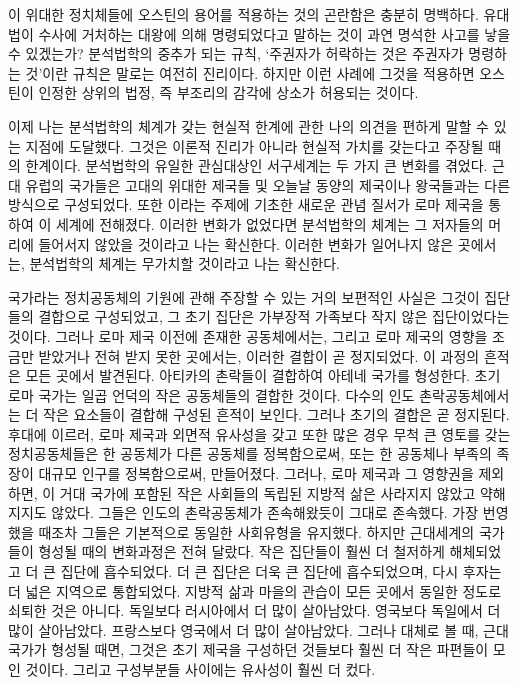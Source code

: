 이 위대한 정치체들에 오스틴의 용어를 적용하는 것의 곤란함은 충분히 명백하다.
유대법이 수사에 거처하는 대왕에 의해 명령되었다고 말하는 것이
과연 명석한 사고를 낳을 수 있겠는가?
분석법학의 중추가 되는 규칙, `주권자가 허락하는 것은 주권자가 명령하는 것'이란
규칙은 말로는 여전히 진리이다.
하지만 이런 사례에 그것을 적용하면
오스틴이 인정한 상위의 법정, 즉 부조리의 감각에 상소가 허용되는 것이다.

이제 나는
분석법학의 체계가
갖는 현실적 한계에 관한 나의 의견을 편하게 말할 수 있는
지점에 도달했다.
그것은 이론적 진리가 아니라 현실적 가치를 갖는다고
주장될 때의 한계이다.
분석법학의 유일한 관심대상인
서구세계는 두 가지 큰 변화를 겪었다.
근대 유럽의 국가들은  고대의 위대한 제국들 및
오늘날 동양의 제국이나 왕국들과는 다른
방식으로 구성되었다.
또한 이라는 주제에 기초한 새로운 관념 질서가
로마 제국을 통하여 이 세계에 전해졌다.
이러한 변화가 없었다면 분석법학의 체계는 그 저자들의 머리에
들어서지 않았을 것이라고 나는 확신한다.
이러한 변화가 일어나지 않은 곳에서는,
분석법학의 체계는 무가치할 것이라고 나는 확신한다.

국가라는 정치공동체의 기원에 관해 주장할 수 있는 거의 보편적인 사실은
그것이 집단들의 결합으로 구성되었고, 그 초기 집단은
가부장적 가족보다 작지 않은 집단이었다는 것이다.
그러나 로마 제국 이전에 존재한 공동체에서는,
그리고 로마 제국의 영향을 조금만 받았거나 전혀 받지 못한 곳에서는,
이러한 결합이 곧 정지되었다.
이 과정의 흔적은 모든 곳에서 발견된다.
아티카의 촌락들이 결합하여 아테네 국가를 형성한다.
초기 로마 국가는 일곱 언덕의 작은 공동체들의 결합한 것이다.
다수의 인도 촌락공동체에서는 더 작은 요소들이 결합해 구성된 흔적이 보인다.
그러나 초기의 결합은 곧 정지된다.
후대에 이르러,
로마 제국과 외면적 유사성을 갖고 또한 많은 경우 무척 큰 영토를 갖는
정치공동체들은
한 공동체가 다른 공동체를 정복함으로써,
또는 한 공동체나 부족의 족장이
대규모 인구를 정복함으로써,
만들어졌다.
그러나, 로마 제국과 그 영향권을 제외하면,
이 거대 국가에 포함된 작은 사회들의 독립된 지방적 삶은
사라지지 않았고 약해지지도 않았다.
그들은 인도의 촌락공동체가 존속해왔듯이 그대로 존속했다.
가장 번영했을 때조차 그들은 기본적으로 동일한 사회유형을 유지했다.
하지만 근대세계의 국가들이 형성될 때의 변화과정은 전혀 달랐다.
작은 집단들이 훨씬 더 철저하게 해체되었고 더 큰 집단에 흡수되었다.
더 큰 집단은 더욱 큰 집단에 흡수되었으며,
다시 후자는 더 넓은 지역으로 통합되었다.
지방적 삶과 마을의 관습이 모든 곳에서 동일한 정도로 쇠퇴한 것은 아니다.
독일보다 러시아에서 더 많이 살아남았다.
영국보다 독일에서 더 많이 살아남았다.
프랑스보다 영국에서 더 많이 살아남았다.
그러나 대체로 볼 때,
근대국가가 형성될 때면, 그것은
초기 제국을 구성하던 것들보다 훨씬 더 작은 파편들이 모인 것이다.
그리고 구성부분들 사이에는 유사성이 훨씬 더 컸다.

